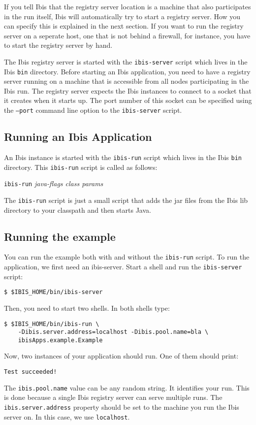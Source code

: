 \documentclass[10pt]{article}
\newcommand{\mysubsection}[1]{\subsection{#1}\label{#1}}
\begin{document}
If you tell Ibis that the registry server location is a machine that also
participates in the run itself, Ibis will automatically try to start
a registry server. How you can specify this is explained in the next section.
If you want to run the registry server on a seperate host, one that is not
behind a firewall, for instance, you have to start the registry server by
hand.

The Ibis registry server is started with the \texttt{ibis-server}
script which lives in the Ibis \texttt{bin} directory.
Before starting an Ibis application,
you need to have a registry server running on a machine that is accessible
from all nodes participating in the Ibis run.
The registry server expects the Ibis instances to connect to a
socket that it creates when it starts up.
The port number of this socket can be specified using the
\texttt{--port} command line option to the \texttt{ibis-server} script.

\mysubsection{Running an Ibis Application}

An Ibis instance is started with the \texttt{ibis-run} script which
lives in the Ibis \texttt{bin} directory.  This \texttt{ibis-run}
script is called as follows:
\begin{center}
\texttt{ibis-run} \emph{java-flags class params}
\end{center}
The \texttt{ibis-run} script is just a small script that adds the jar files
from the Ibis lib directory to your classpath and then starts Java.

\mysubsection{Running the example}
You can run the example both with and without the \texttt{ibis-run} script.
To run the application, we first need an ibis-server. Start a shell and
run the \texttt{ibis-server} script:
\noindent
{\small
\begin{verbatim}
$ $IBIS_HOME/bin/ibis-server
\end{verbatim}
}
\noindent

Then, you need to start two shells. In both shells type:

\noindent
{\small
\begin{verbatim}
$ $IBIS_HOME/bin/ibis-run \
    -Dibis.server.address=localhost -Dibis.pool.name=bla \
    ibisApps.example.Example
\end{verbatim}
}
\noindent
Now, two instances of your application should run. One of them should print:

\noindent
{\small
\begin{verbatim}
Test succeeded!
\end{verbatim}
}
\noindent
The \texttt{ibis.pool.name} value can be any random string.
It identifies your run.
This is done because a single Ibis registry server can serve multiple
runs.
The \texttt{ibis.server.address} property should
be set to the machine you run the Ibis server on. In this case, we use
\texttt{localhost}.
\end{document}
